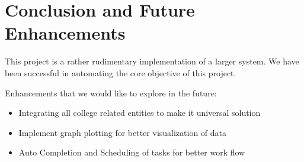 \chapter{Conclusion and Future Enhancements}
This project is a rather rudimentary implementation of a larger system.
We have been successful in automating the core objective of this project.

Enhancements that we would like to explore in the future:
\begin{itemize}
\item Integrating all college related entities to make it universal solution
\item Implement graph plotting for better visualization of data
\item Auto Completion and Scheduling of tasks for better work flow
\end{itemize}
\pagebreak
